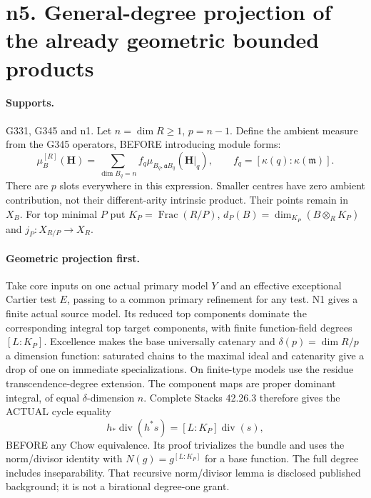 \section{n5. General-degree projection of the already geometric bounded products}
\paragraph{Supports.} G331, G345 and n1.
Let $n=\dim R\ge1$, $p=n-1$. Define the ambient measure from the G345 operators, BEFORE introducing module forms:
\[
 \mu_B^{[R]}(\boldsymbol H)=\sum_{\dim B_q=n} f_q\mu_{B_q,\mathfrak aB_q}(\boldsymbol H|_q),
 \qquad f_q=[\kappa(q):\kappa(\mathfrak m)].
\]
There are $p$ slots everywhere in this expression. Smaller centres have zero ambient contribution, not their different-arity intrinsic product. Their points remain in $X_B$. For top minimal $P$ put $K_P=\operatorname{Frac}(R/P)$, $d_P(B)=\dim_{K_P}(B\otimes_RK_P)$ and $j_P:X_{R/P}\to X_R$.

\paragraph{Geometric projection first.}
Take core inputs on one actual primary model $Y$ and an effective exceptional Cartier test $E$, passing to a common primary refinement for any test. N1 gives a finite actual source model. Its reduced top components dominate the corresponding integral top target components, with finite function-field degrees $[L:K_P]$. Excellence makes the base universally catenary and $\delta(p)=\dim R/p$ a dimension function: saturated chains to the maximal ideal and catenarity give a drop of one on immediate specializations. On finite-type models use the residue transcendence-degree extension. The component maps are proper dominant integral, of equal $\delta$-dimension $n$. Complete Stacks 42.26.3 therefore gives the ACTUAL cycle equality
\[
 h_*\operatorname{div}(h^*s)=[L:K_P]\operatorname{div}(s), \tag{7}
\]
BEFORE any Chow equivalence. Its proof trivializes the bundle and uses the norm/divisor identity with $N(g)=g^{[L:K_P]}$ for a base function. The full degree includes inseparability. That recursive norm/divisor lemma is disclosed published background; it is not a birational degree-one grant.

